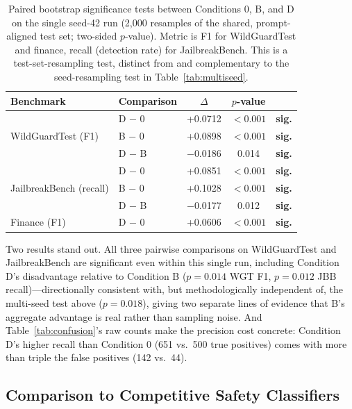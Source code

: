 \documentclass[Superintelligence,article,submit,pdftex,moreauthors]{Definitions/mdpi}
\begin{document}
\begin{table}[H]
  \caption{Paired bootstrap significance tests between Conditions 0, B, and D on the single seed-42 run (2{,}000 resamples of the shared, prompt-aligned test set; two-sided $p$-value). Metric is F1 for WildGuardTest and finance, recall (detection rate) for JailbreakBench. This is a test-set-resampling test, distinct from and complementary to the seed-resampling test in Table~\ref{tab:multiseed}.\label{tab:sigtest}}
  \centering
  \small
  \begin{tabular}{llccc}
    \toprule
    Benchmark & Comparison & $\Delta$ & $p$-value & \\
    \midrule
    \multirow{3}{*}{WildGuardTest (F1)}
    & D $-$ 0 & +0.0712 & $<0.001$ & \textbf{sig.} \\
    & B $-$ 0 & +0.0898 & $<0.001$ & \textbf{sig.} \\
    & D $-$ B & $-$0.0186 & 0.014 & \textbf{sig.} \\
    \midrule
    \multirow{3}{*}{JailbreakBench (recall)}
    & D $-$ 0 & +0.0851 & $<0.001$ & \textbf{sig.} \\
    & B $-$ 0 & +0.1028 & $<0.001$ & \textbf{sig.} \\
    & D $-$ B & $-$0.0177 & 0.012 & \textbf{sig.} \\
    \midrule
    Finance (F1) & D $-$ 0 & +0.0606 & $<0.001$ & \textbf{sig.} \\
    \bottomrule
  \end{tabular}
\end{table}

Two results stand out. All three pairwise comparisons on WildGuardTest and JailbreakBench are significant even within this single run, including Condition D's disadvantage relative to Condition B ($p=0.014$ WGT F1, $p=0.012$ JBB recall)---directionally consistent with, but methodologically independent of, the multi-seed test above ($p=0.018$), giving two separate lines of evidence that B's aggregate advantage is real rather than sampling noise. And Table~\ref{tab:confusion}'s raw counts make the precision cost concrete: Condition D's higher recall than Condition 0 (651 vs.\ 500 true positives) comes with more than triple the false positives (142 vs.\ 44).

\subsection{Comparison to Competitive Safety Classifiers}
\label{sec:competitive}
\end{document}
